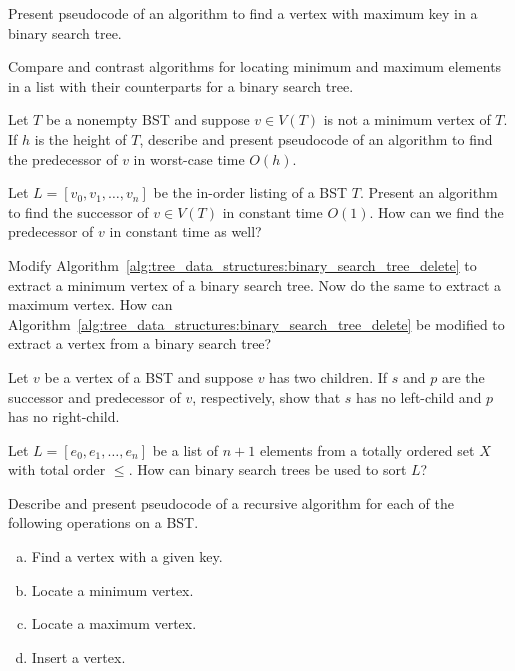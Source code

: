 \begin{problem}
\item Present pseudocode of an algorithm to find a vertex with maximum
  key in a binary search tree.

\item Compare and contrast algorithms for locating minimum and maximum
  elements in a list with their counterparts for a binary search tree.

\item Let $T$ be a nonempty BST and suppose $v \in V(T)$ is not a
  minimum vertex of $T$. If $h$ is the height of $T$, describe and
  present pseudocode of an algorithm to find the predecessor of $v$ in
  worst-case time $O(h)$.

\item Let $L = [v_0, v_1, \dots, v_n]$ be the in-order listing of a
  BST $T$. Present an algorithm to find the successor of
  $v \in V(T)$ in constant time $O(1)$. How can we find the
  predecessor of $v$ in constant time as well?

\item Modify
  Algorithm~\ref{alg:tree_data_structures:binary_search_tree_delete}
  to extract a minimum vertex of a binary search tree. Now do the same
  to extract a maximum vertex. How can
  Algorithm~\ref{alg:tree_data_structures:binary_search_tree_delete}
  be modified to extract a vertex from a binary search tree?

\item Let $v$ be a vertex of a BST and suppose $v$ has two
  children. If $s$ and $p$ are the successor and predecessor of $v$,
  respectively, show that $s$ has no left-child and $p$ has no
  right-child.

\item Let $L = [e_0, e_1, \dots, e_n]$ be a list of $n + 1$ elements
  from a totally ordered set $X$ with total order $\leq$. How can
  binary search trees be used to sort $L$?

\item Describe and present pseudocode of a recursive algorithm for
  each of the following operations on a BST.
  \begin{enumerate}[(a)]
  \item Find a vertex with a given key.

  \item Locate a minimum vertex.

  \item Locate a maximum vertex.

  \item Insert a vertex.
  \end{enumerate}


\end{problem}
